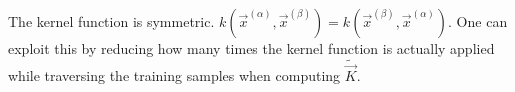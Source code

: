 \begin{frame}{\subsecname}


\pause

The kernel function is symmetric. $k(\vec x^{(\alpha)}, \vec x^{(\beta)}) = k(\vec x^{(\beta)}, \vec x^{(\alpha)})$. One can exploit this by reducing how many times the kernel function is actually applied while traversing the training samples when computing $\widetilde {\vec{K}}$.

\end{frame}
